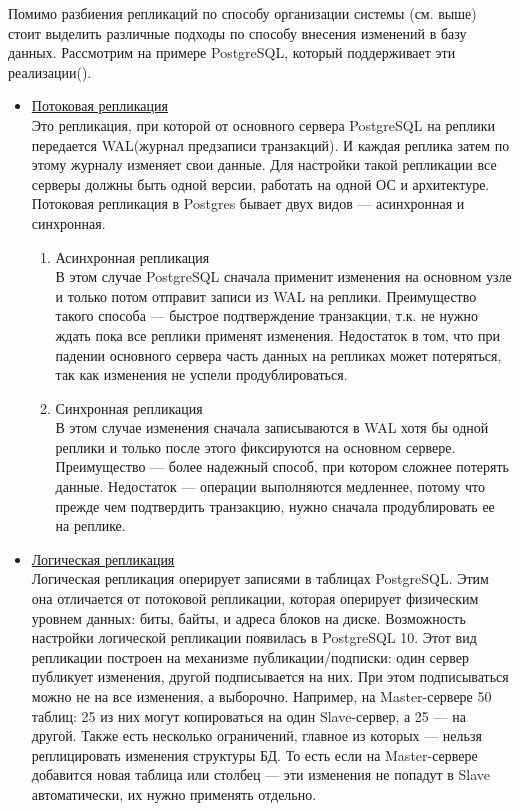 \begin{enumerate}
    Помимо разбиения репликаций по способу организации системы (см. выше) стоит выделить различные подходы по способу внесения изменений в базу данных. Рассмотрим на примере PostgreSQL, который поддерживает эти реализации(\autocite{PostrgreSQL1}).
    \begin{itemize}
        \item \underline{Потоковая репликация} \\Это репликация, при которой от основного сервера PostgreSQL на реплики передается WAL(журнал предзаписи транзакций). И каждая реплика затем по этому журналу изменяет свои данные. Для настройки такой репликации все серверы должны быть одной версии, работать на одной ОС и архитектуре. Потоковая репликация в Postgres бывает двух видов — асинхронная и синхронная.
		\begin{enumerate}
        		\item{Асинхронная репликация} \\В этом случае PostgreSQL сначала применит изменения на основном узле и только потом отправит записи из WAL на реплики. Преимущество такого способа — быстрое подтверждение транзакции, т.к. не нужно ждать пока все реплики применят изменения. Недостаток в том, что при падении основного сервера часть данных на репликах может потеряться, так как изменения не успели продублироваться.
        		\item{Синхронная репликация} \\В этом случае изменения сначала записываются в WAL хотя бы одной реплики и только после этого фиксируются на основном сервере. Преимущество — более надежный способ, при котором сложнее потерять данные. Недостаток — операции выполняются медленнее, потому что прежде чем подтвердить транзакцию, нужно сначала продублировать ее на реплике.
        	\end{enumerate}
        	\item \underline{Логическая репликация} \\Логическая репликация оперирует записями в таблицах PostgreSQL. Этим она отличается от потоковой репликации, которая оперирует физическим уровнем данных: биты, байты, и адреса блоков на диске. Возможность настройки логической репликации появилась в PostgreSQL 10.
Этот вид репликации построен на механизме публикации/подписки: один сервер публикует изменения, другой подписывается на них. При этом подписываться можно не на все изменения, а выборочно. Например, на Master-сервере 50 таблиц: 25 из них могут копироваться на один Slave-сервер, а 25 — на другой.
Также есть несколько ограничений, главное из которых — нельзя реплицировать изменения структуры БД. То есть если на Master-сервере добавится новая таблица или столбец — эти изменения не попадут в Slave автоматически, их нужно применять отдельно.

\end{itemize}
\end{enumerate}
